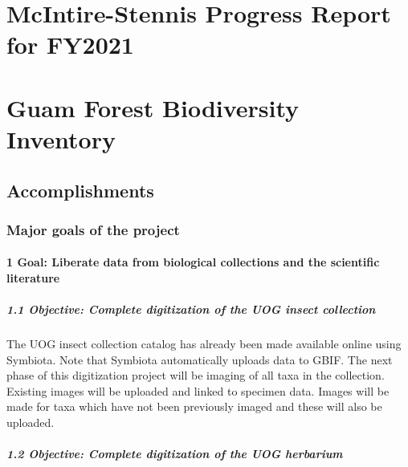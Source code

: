 \documentclass[
]{article}
\author{}
\date{}
\begin{document}
\hypertarget{mcintire-stennis-progress-report-for-fy2021}{%
\section{McIntire-Stennis Progress Report for
FY2021}\label{mcintire-stennis-progress-report-for-fy2021}}

\hypertarget{guam-forest-biodiversity-inventory}{%
\section{Guam Forest Biodiversity
Inventory}\label{guam-forest-biodiversity-inventory}}

\hypertarget{accomplishments}{%
\subsection{Accomplishments}\label{accomplishments}}

\hypertarget{major-goals-of-the-project}{%
\subsubsection{Major goals of the
project}\label{major-goals-of-the-project}}

\hypertarget{goal-liberate-data-from-biological-collections-and-the-scientific-literature}{%
\paragraph{1 Goal: Liberate data from biological collections and the
scientific
literature}\label{goal-liberate-data-from-biological-collections-and-the-scientific-literature}}

\hypertarget{objective-complete-digitization-of-the-uog-insect-collection}{%
\subparagraph{1.1 Objective: Complete digitization of the UOG insect
collection}\label{objective-complete-digitization-of-the-uog-insect-collection}}

The UOG insect collection catalog has already been made available online
using Symbiota. Note that Symbiota automatically uploads data to GBIF.
The next phase of this digitization project will be imaging of all taxa
in the collection. Existing images will be uploaded and linked to
specimen data. Images will be made for taxa which have not been
previously imaged and these will also be uploaded.

\hypertarget{objective-complete-digitization-of-the-uog-herbarium}{%
\subparagraph{1.2 Objective: Complete digitization of the UOG
herbarium}\label{objective-complete-digitization-of-the-uog-herbarium}}
\end{document}
